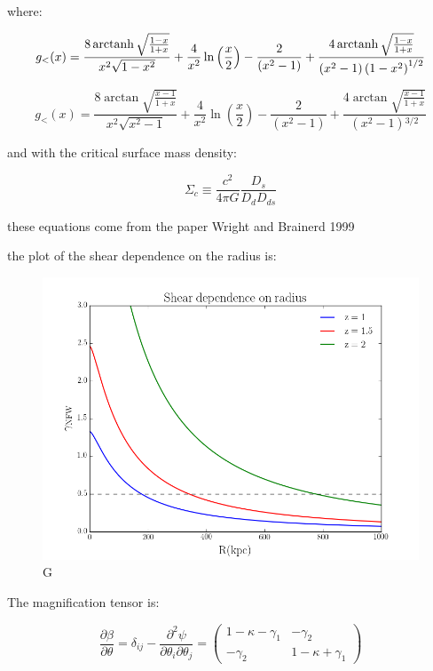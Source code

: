 where: 

\begin{equation}
g_{<}(x)=\frac{8 \operatorname{arctanh} \sqrt{\frac{1-x}{1+x}}}{x^{2}\sqrt{1-x^{2}}}+\frac{4}{x^{2}} \ln \left(\frac{x}{2}\right)-\frac{2}{\left(x^{2}-1\right)}+\frac{4 \operatorname{arctanh} \sqrt{\frac{1-x}{1+x}}}{\left(x^{2}-1\right)\left(1-x^{2}\right)^{1/2}}
\end{equation}

\begin{equation}
g_{<}(x)=\frac{8 \arctan \sqrt{\frac{x-1}{1+x}}}{x^{2}\sqrt{x^{2}-1}}+\frac{4}{x^{2}}\ln \left(\frac{x}{2}\right)-\frac{2}{\left(x^{2}-1\right)}+\frac{4 \arctan \sqrt{\frac{x-1}{1+x}}}{\left(x^{2}-1\right){}^{3/2}}
\end{equation} 

and with the critical surface mass density:

\begin{equation}
\Sigma_{c}\equiv\frac{c^{2}}{4\pi G}\frac{D_{s}}{D_{d}D_{ds}}
\end{equation}

these equations come from the paper Wright and Brainerd 1999

the plot of the shear dependence on the radius is:

\begin{figure}[H]
\centering
\includegraphics[width=12cm]{images/Shear dependence on radius.png}
\caption[M]{G}
\end{figure}

The magnification tensor is:

\begin{equation}
\frac{\partial\beta}{\partial\theta}=\delta_{ij}-\frac{\partial^{2}\psi}{\partial\theta_{i}\partial\theta_{j}}=\left(\begin{array}{cc}
1-\kappa-\gamma_{1} & -\gamma_{2}\\
-\gamma_{2} & 1-\kappa+\gamma_{1}
\end{array}\right)
\end{equation}

